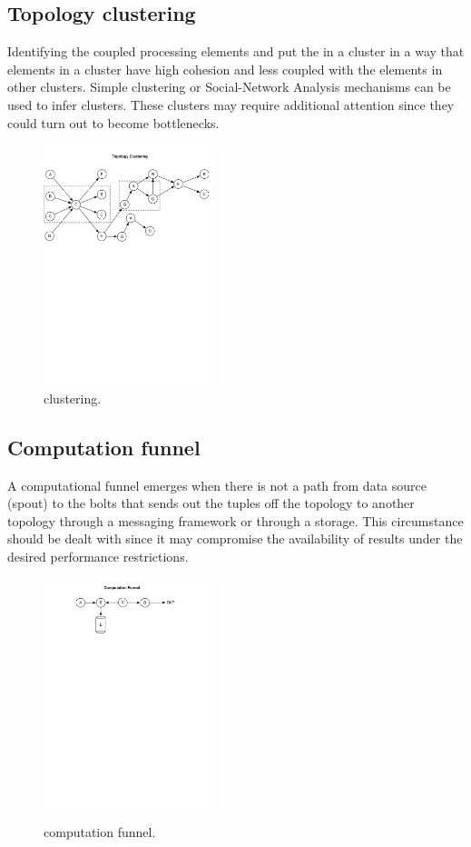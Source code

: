 \subsection{Topology clustering}
Identifying the coupled processing elements and put the in a cluster in a way that elements in a cluster have high cohesion and less coupled with the elements in other clusters. Simple clustering or Social-Network Analysis mechanisms can be used to infer clusters. These clusters may require additional attention since they could turn out to become bottlenecks.

\begin{figure}[H]
	\begin{center}
		\includegraphics[width=5cm]{images/clustering}
		\caption{clustering.}
		\label{fig:clustering}
	\end{center}
\end{figure}

\subsection{Computation funnel}
A computational funnel emerges when there is not a path from data source (spout) to the bolts that sends out the tuples off the topology to another topology through a messaging framework or through a storage. This circumstance should be dealt with since it may compromise the availability of results under the desired performance restrictions.

\begin{figure}[H]
	\begin{center}
		\includegraphics[width=5cm]{images/funnel}
		\caption{computation funnel.}
		\label{fig:funnel}
	\end{center}
\end{figure}

